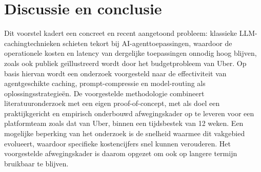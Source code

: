 \documentclass{hogent-article}
\begin{document}
\section{Discussie en conclusie}%
\label{sec:conclusie}

Dit voorstel kadert een concreet en recent aangetoond probleem: klassieke LLM-cachingtechnieken schieten tekort bij AI-agenttoepassingen, waardoor de operationele kosten en latency van dergelijke toepassingen onnodig hoog blijven, zoals ook publiek geïllustreerd wordt door het budgetprobleem van Uber. Op basis hiervan wordt een onderzoek voorgesteld naar de effectiviteit van agentgeschikte caching, prompt-compressie en model-routing als oplossingsstrategieën. De voorgestelde methodologie combineert literatuuronderzoek met een eigen proof-of-concept, met als doel een praktijkgericht en empirisch onderbouwd afwegingskader op te leveren voor een platformteam zoals dat van Uber, binnen een tijdsbestek van 12 weken. Een mogelijke beperking van het onderzoek is de snelheid waarmee dit vakgebied evolueert, waardoor specifieke kostencijfers snel kunnen verouderen. Het voorgestelde afwegingskader is daarom opgezet om ook op langere termijn bruikbaar te blijven.

\printbibliography[heading=bibintoc]
\end{document}

